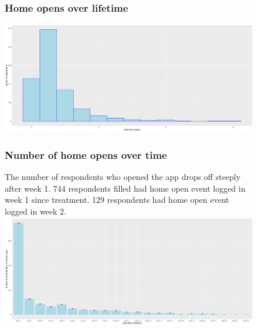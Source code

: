 \documentclass{article}
\begin{document}
\begin{figure}
\subsubsection*{Home opens over lifetime}
\includegraphics[scale=0.4]{app usage/plots/individual aggregates - home opens over lifetime.png}

\subsubsection*{Number of home opens over time}
The number of respondents who opened the app drops off steeply after week 1. 744 respondents filled had home open event logged in week 1 since treatment. 129 respondents had home open event logged in week 2. 
\includegraphics[scale=0.4]{app usage/plots/home opens over time - home opens.png}
\end{figure}
\end{document}
